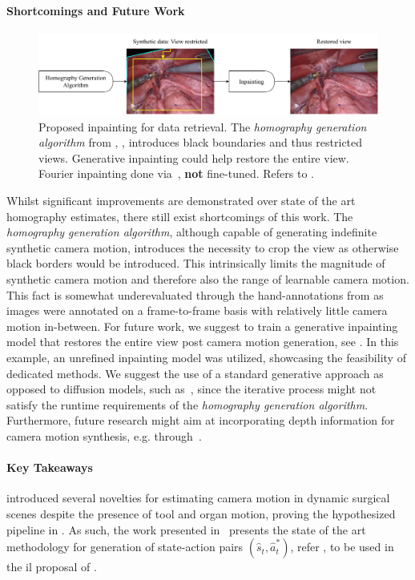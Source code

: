 \paragraph{Shortcomings and Future Work}
\begin{figure}[tb]
    \centering
    \includegraphics[width=\textwidth]{conclusion/fig/fourier_inpainting.pdf}
    \caption{Proposed inpainting for data retrieval. The \textit{homography generation algorithm} from , , introduces black boundaries and thus restricted views. Generative inpainting could help restore the entire view. Fourier inpainting done via~\cite{suvorov2021resolution}, \textbf{not} fine-tuned. Refers to .}
    \label{con:fig:inpainting}
\end{figure}
Whilst significant improvements are demonstrated over state of the art homography estimates, there still exist shortcomings of this work. The \textit{homography generation algorithm}, although capable of generating indefinite synthetic camera motion, introduces the necessity to crop the view as otherwise black borders would be introduced. This intrinsically limits the magnitude of synthetic camera motion and therefore also the range of learnable camera motion. This fact is somewhat underevaluated through the hand-annotations from  as images were annotated on a frame-to-frame basis with relatively little camera motion in-between. For future work, we suggest to train a generative inpainting model that restores the entire view post camera motion generation, see . In this example, an unrefined inpainting model was utilized, showcasing the feasibility of dedicated methods. We suggest the use of a standard generative approach as opposed to diffusion models, such as~\cite{rombach2022high}, since the iterative process might not satisfy the runtime requirements of the \textit{homography generation algorithm}. Furthermore, future research might aim at incorporating depth information for camera motion synthesis, e.g. through~\cite{budd2024transferring}.

\paragraph{Key Takeaways}  introduced several novelties for estimating camera motion in dynamic surgical scenes despite the presence of tool and organ motion, proving the hypothesized pipeline in . As such, the work presented in~\cite{huber2022deep} presents the state of the art methodology for generation of state-action pairs $(\hat{s}_t, \hat{a}^*_t)$, refer , to be used in the \gls{il} proposal of .

